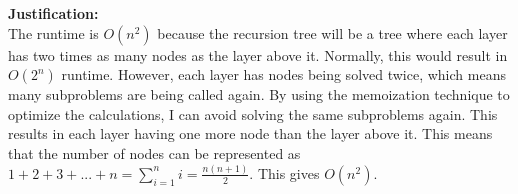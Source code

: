 \documentclass[11pt]{article}
\newenvironment{justification}{\par{\bf Justification:}}{\smallskip}
\begin{document}
\begin{justification}
\\
The runtime is $O(n ^ 2)$ because the recursion tree will be a tree where each layer has two times as many nodes as the layer above it. Normally, this would result in $O(2 ^ n)$ runtime. However, each layer has nodes being solved twice, which means many subproblems are being called again. By using the memoization technique to optimize the calculations, I can avoid solving the same subproblems again. This results in each layer having one more node than the layer above it. This means that the number of nodes can be represented as $1 + 2 + 3 + ... + n = \displaystyle{\sum_{i = 1}^{n} i} = \frac{n \left(n + 1\right)} {2}$. This gives $O(n ^ 2)$.
\end{justification}



\newpage
\end{document}
